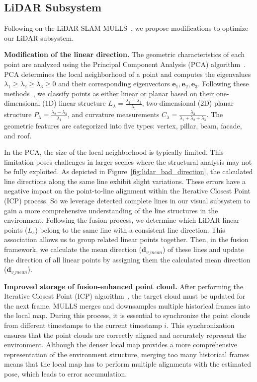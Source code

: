 \subsection{LiDAR Subsystem}
Following on the LiDAR SLAM MULLS~\cite{pan2021mulls}, we propose modifications to optimize our LiDAR subsystem. 
%

\noindent\textbf{Modification of the linear direction.} The geometric characteristics of each point are analyzed using the Principal Component Analysis (PCA) algorithm~\cite{hackel2016fast, weinmann2013feature}. PCA determines the local neighborhood of a point and computes the eigenvalues $\lambda_{1} \geq \lambda_{2} \geq \lambda_{3} \geq 0$ and their corresponding eigenvectors $\mathbf{e}_{1}, \mathbf{e}_{2}, \mathbf{e}_{3}$. Following these methods~\cite{hackel2016fast, weinmann2013feature}, we classify points as either linear or planar based on their one-dimensional (1D) linear structure $L_{\lambda}=\frac{\lambda_{1}-\lambda_{2}}{\lambda_{1}}$, two-dimensional (2D) planar structure $P_{\lambda}=\frac{\lambda_{2}-\lambda_{3}}{\lambda_{1}}$, and curvature measurements $C_{\lambda}=\frac{\lambda_{3}}{\lambda_{1}+\lambda_{2}+\lambda_{3}}$. 
%
The geometric features are categorized into five types: vertex, pillar, beam, facade, and roof. 

In the PCA, the size of the local neighborhood is typically limited. This limitation poses challenges in larger scenes where the structural analysis may not be fully exploited. As depicted in Figure~\ref{fig:lidar_bad_direction}, the calculated line directions along the same line exhibit slight variations. These errors have a negative impact on the point-to-line alignment within the Iterative Closest Point (ICP) process. So we leverage detected complete lines in our visual subsystem to gain a more comprehensive understanding of the line structures in the environment. Following the fusion process, we determine which LiDAR linear points ($L_s$) belong to the same line with a consistent line direction. This association allows us to group related linear points together. Then, in the fusion framework, we calculate the mean direction ($\mathbf d_{v\_mean}$) of these lines and update the direction of all linear points by assigning them the calculated mean direction ($\mathbf d_{v\_mean}$).

\noindent\textbf{Improved storage of fusion-enhanced point cloud.} After performing the Iterative Closest Point (ICP) algorithm~\cite{besl1992method}, the target cloud must be updated for the next frame. MULLS merges and downsamples multiple historical frames into the local map. During this process, it is essential to synchronize the point clouds from different timestamps to the current timestamp $i$. This synchronization ensures that the point clouds are correctly aligned and accurately represent the environment. Although the denser local map provides a more comprehensive representation of the environment structure, merging too many historical frames means that the local map has to perform multiple alignments with the estimated pose, which leads to error accumulation. 

